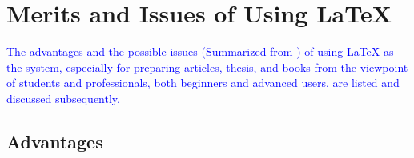 \documentclass[phd]{ndsu-thesis-2022}
\newcommand\italk[1]{\textcolor{blue}{#1}}  %
\newcommand\lx{\LaTeX\xspace}
\begin{document}
\kant[9]

\section{Merits and Issues of Using \lx}
\italk{The advantages and the possible issues (Summarized from \citet{cannayen2011latex}) of using \lx as the system, especially for preparing articles, thesis, and books from the viewpoint of students and professionals, both beginners and advanced users, are listed and discussed subsequently.} 

\subsection{Advantages}
\end{document}
